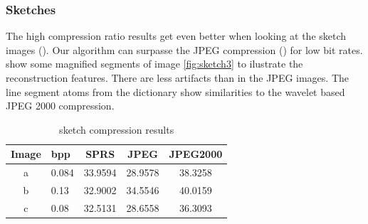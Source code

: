 
\clearpage
\subsubsection{Sketches}
The high compression ratio results get even better when looking at the sketch
images (). Our algorithm can surpasse the JPEG
compression () for low bit rates.
 show some magnified segments of image
\ref{fig:sketch3} to ilustrate the reconstruction features. There are less
artifacts than in the JPEG images. The line segment atoms from the dictionary
show similarities to the wavelet based JPEG 2000 compression.


\begin{table}[H]
\centering
\begin{tabular}{| c l | c | c | c|}
\hline\hline
Image & bpp & SPRS & JPEG & JPEG2000 \\
\hline
a & 0.084 & 33.9594 & 28.9578 & 38.3258  \\
\hline
b & 0.13 & 32.9002 & 34.5546 &  40.0159 \\
\hline
c & 0.08 & 32.5131 & 28.6558 & 36.3093  \\
\hline
\end{tabular}
\caption{sketch compression results}
\label{tab:compression2}
\end{table}

